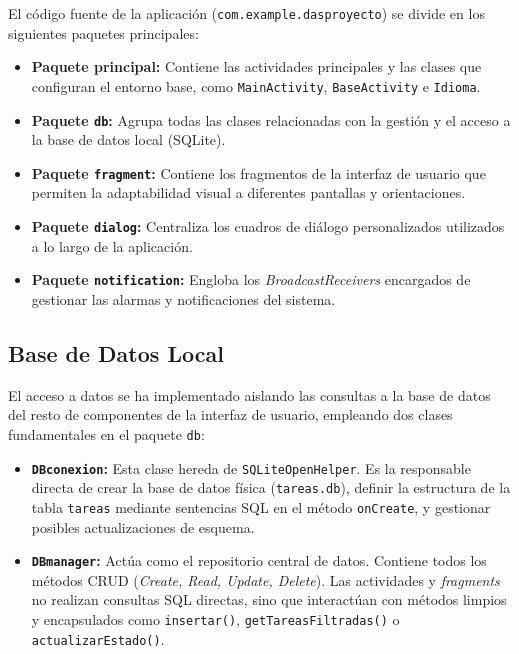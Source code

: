 \documentclass{article}
\begin{document}
El código fuente de la aplicación (\texttt{com.example.dasproyecto}) se divide en los siguientes paquetes principales:
\begin{itemize}
    \item \textbf{Paquete principal:} Contiene las actividades principales y las clases que configuran el entorno base, como \texttt{MainActivity}, \texttt{BaseActivity} e \texttt{Idioma}.
    \item \textbf{Paquete \texttt{db}:} Agrupa todas las clases relacionadas con la gestión y el acceso a la base de datos local (SQLite).
    \item \textbf{Paquete \texttt{fragment}:} Contiene los fragmentos de la interfaz de usuario que permiten la adaptabilidad visual a diferentes pantallas y orientaciones.
    \item \textbf{Paquete \texttt{dialog}:} Centraliza los cuadros de diálogo personalizados utilizados a lo largo de la aplicación.
    \item \textbf{Paquete \texttt{notification}:} Engloba los \textit{BroadcastReceivers} encargados de gestionar las alarmas y notificaciones del sistema.
\end{itemize}

\subsection{Base de Datos Local}

El acceso a datos se ha implementado aislando las consultas a la base de datos del resto de componentes de la interfaz de usuario, empleando dos clases fundamentales en el paquete \texttt{db}:

\begin{itemize}
    \item \textbf{\texttt{DBconexion}:} Esta clase hereda de \texttt{SQLiteOpenHelper}. Es la responsable directa de crear la base de datos física (\texttt{tareas.db}), definir la estructura de la tabla \texttt{tareas} mediante sentencias SQL en el método \texttt{onCreate}, y gestionar posibles actualizaciones de esquema.
    \item \textbf{\texttt{DBmanager}:} Actúa como el repositorio central de datos. Contiene todos los métodos CRUD (\textit{Create, Read, Update, Delete}). Las actividades y \textit{fragments} no realizan consultas SQL directas, sino que interactúan con métodos limpios y encapsulados como \texttt{insertar()}, \texttt{getTareasFiltradas()} o \texttt{actualizarEstado()}.
\end{itemize}
\end{document}
